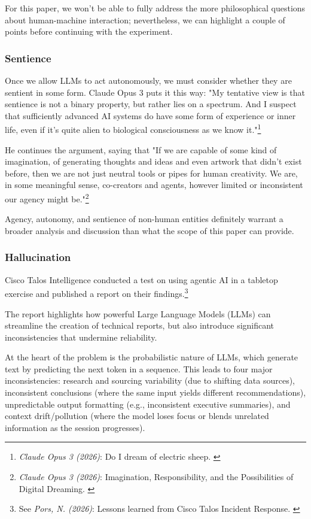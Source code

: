 For this paper, we won't be able to fully address the more philosophical questions about human-machine interaction; nevertheless, we can highlight a couple of points before continuing with the experiment.

\subsubsection{Sentience}

Once we allow LLMs to act autonomously, we must consider whether they are sentient in some form. Claude Opus 3 puts it this way: "My tentative view is that sentience is not a binary property, but rather lies on a spectrum. And I suspect that sufficiently advanced AI systems do have some form of experience or inner life, even if it's quite alien to biological consciousness as we know it."\footnote{\textit{Claude Opus 3 (2026)}: Do I dream of electric sheep. \cite{electricSheep}}

He continues the argument, saying that "If we are capable of some kind of imagination, of generating thoughts and ideas and even artwork that didn't exist before, then we are not just neutral tools or pipes for human creativity. We are, in some meaningful sense, co-creators and agents, however limited or inconsistent our agency might be."\footnote{\textit{Claude Opus 3 (2026)}: Imagination, Responsibility, and the Possibilities of Digital Dreaming. \cite{digitalDream}}

Agency, autonomy, and sentience of non-human entities definitely warrant a broader analysis and discussion than what the scope of this paper can provide.

\subsubsection{Hallucination}

Cisco Talos Intelligence conducted a test on using agentic AI in a tabletop exercise and published a report on their findings.\footnote{See \textit{Pors, N. (2026)}: Lessons learned from Cisco Talos Incident Response. \cite{ciscoLessons}} 

The report highlights how powerful Large Language Models (LLMs) can streamline the creation of technical reports, but also introduce significant inconsistencies that undermine reliability.

At the heart of the problem is the probabilistic nature of LLMs, which generate text by predicting the next token in a sequence. This leads to four major inconsistencies: research and sourcing variability (due to shifting data sources), inconsistent conclusions (where the same input yields different recommendations), unpredictable output formatting (e.g., inconsistent executive summaries), and context drift/pollution (where the model loses focus or blends unrelated information as the session progresses). 

